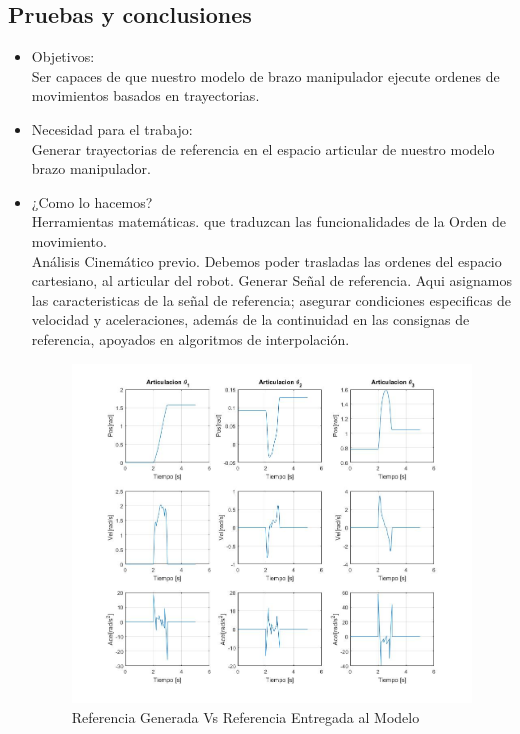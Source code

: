 	
	
	
	\subsection{Pruebas y conclusiones}
	\begin{itemize}
		\item Objetivos: \\
		Ser capaces de que nuestro modelo de brazo manipulador ejecute ordenes de movimientos basados en trayectorias.\\

		\item Necesidad para el trabajo: \\
		Generar trayectorias de referencia en el espacio articular de nuestro modelo brazo manipulador.\\

		\item ¿Como lo hacemos? \\ 
		Herramientas matemáticas. que traduzcan las funcionalidades de la Orden de movimiento. \\ 
		Análisis Cinemático previo. Debemos poder trasladas las ordenes del espacio cartesiano, al articular del robot.
		Generar Señal de referencia. Aqui asignamos las caracteristicas de la señal de referencia; asegurar condiciones 
		especificas de velocidad y aceleraciones, además de la continuidad en las consignas de referencia, apoyados en algoritmos
		de interpolación. 

		\begin{figure}[h!]
			\centering
			\includegraphics[width=.4\textwidth]{GeneradorTrayLineal}
			\caption{Referencia Generada Vs Referencia Entregada al Modelo}
		\end{figure}

		



\end{itemize}
